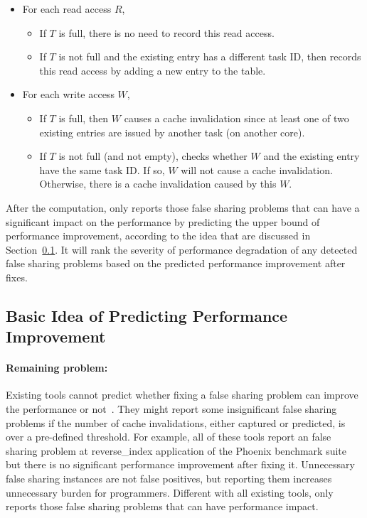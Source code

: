 \begin{itemize}
\item
  For each read access $R$,
  \begin{itemize}
    \item
      If $T$ is full, there is no need to record this read access.
    \item
      If $T$ is not full and the existing entry has a different task ID, 
      then \cheetah{} records this read access by adding a new entry to the table.
  \end{itemize}
\item
  For each write access $W$,  
  \begin{itemize}
    \item
      If $T$ is full, then $W$ causes a cache invalidation since at least one of two existing entries are issued by another task (on another core).
    \item
      If $T$ is not full (and not empty),
      \cheetah{} checks whether $W$ and the existing entry have the same task ID. If
      so, $W$ will not cause a cache invalidation. Otherwise, there is a cache invalidation caused by this $W$.
  \end{itemize}
\end{itemize}

      
After the computation, 
\cheetah{} only reports those false sharing problems that can have a significant impact on the performance by predicting the upper bound of performance improvement, according to the idea that are discussed in Section~\ref{sec:predictimprovement}.  It will rank the severity of performance degradation of any detected false sharing problems based on the predicted performance improvement after fixes.

\subsection{Basic Idea of Predicting Performance Improvement}
\label{sec:predictimprovement}

\paragraph{Remaining problem:} Existing tools cannot predict whether fixing a false sharing problem can improve the performance or not~\cite{sheriff, Predator, openmp}. They might report some insignificant false sharing problems if the number of cache invalidations, either captured or predicted, is over a pre-defined threshold. For example, all of these tools report an false sharing problem at reverse\_index application of the Phoenix benchmark suite but there is no significant performance improvement after fixing it. Unnecessary false sharing instances are not false positives, but reporting them increases unnecessary burden for programmers. Different with all existing tools, \Cheetah{} only reports those false sharing problems that can have performance impact.  

